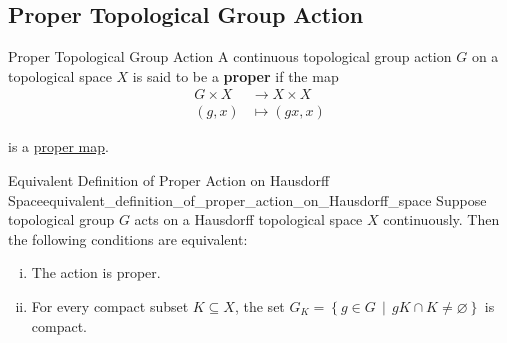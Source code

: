 \documentclass{report}
\newcommand{\midv}{\,\middle\vert\,}
\begin{document}
\subsection{Proper Topological Group Action}

\begin{definition}{Proper Topological Group Action}{}
	A continuous topological group action $G$ on a topological space $X$ is said to be a \textbf{proper} if the map
	\begin{align*}
		G \times X &\longrightarrow X \times X\\
		(g, x) &\longmapsto(g x, x)
	\end{align*}
	
	is a \hyperref[th:proper_map]{proper map}.
\end{definition}

\begin{proposition}{Equivalent Definition of Proper Action on Hausdorff Space}{equivalent_definition_of_proper_action_on_Hausdorff_space}
	Suppose topological group $G$ acts on a Hausdorff topological space $X$ continuously. Then the following conditions are equivalent:
	\begin{enumerate}[(i)]
		\item The action is proper.
		\item For every compact subset $K \subseteq X$, the set $G_K=\left\{g \in G\midv  gK\cap K\neq \varnothing\right\}$ is compact.
	\end{enumerate}
\end{proposition}
\end{document}
